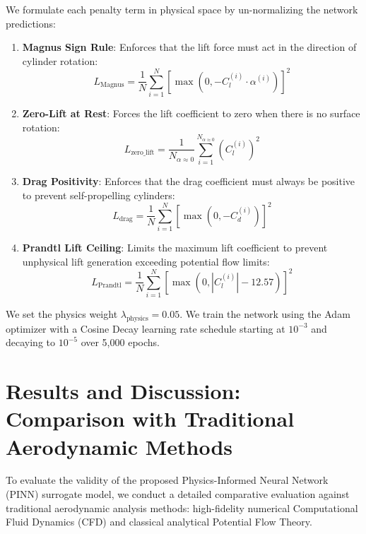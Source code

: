 \documentclass[aip,pof,reprint,onecolumn,amsmath,amssymb,graphicx,longbibliography]{revtex4-2}
\begin{document}
We formulate each penalty term in physical space by un-normalizing the network predictions:
\begin{enumerate}
    \item \textbf{Magnus Sign Rule}: Enforces that the lift force must act in the direction of cylinder rotation:
    \begin{equation}
    L_{\text{Magnus}} = \frac{1}{N} \sum_{i=1}^{N} \left[ \max(0, -C_l^{(i)} \cdot \alpha^{(i)}) \right]^2
    \end{equation}
    \item \textbf{Zero-Lift at Rest}: Forces the lift coefficient to zero when there is no surface rotation:
    \begin{equation}
    L_{\text{zero\_lift}} = \frac{1}{N_{\alpha \approx 0}} \sum_{i=1}^{N_{\alpha \approx 0}} \left( C_l^{(i)} \right)^2
    \end{equation}
    \item \textbf{Drag Positivity}: Enforces that the drag coefficient must always be positive to prevent self-propelling cylinders:
    \begin{equation}
    L_{\text{drag}} = \frac{1}{N} \sum_{i=1}^{N} \left[ \max(0, -C_d^{(i)}) \right]^2
    \end{equation}
    \item \textbf{Prandtl Lift Ceiling}: Limits the maximum lift coefficient to prevent unphysical lift generation exceeding potential flow limits:
    \begin{equation}
    L_{\text{Prandtl}} = \frac{1}{N} \sum_{i=1}^{N} \left[ \max(0, |C_l^{(i)}| - 12.57) \right]^2
    \end{equation}
\end{enumerate}
We set the physics weight $\lambda_{\text{physics}} = 0.05$. We train the network using the Adam optimizer with a Cosine Decay learning rate schedule starting at $10^{-3}$ and decaying to $10^{-5}$ over 5,000 epochs.

\section{\label{sec:discussion}Results and Discussion: Comparison with Traditional Aerodynamic Methods}
To evaluate the validity of the proposed Physics-Informed Neural Network (PINN) surrogate model, we conduct a detailed comparative evaluation against traditional aerodynamic analysis methods: high-fidelity numerical Computational Fluid Dynamics (CFD) and classical analytical Potential Flow Theory.
\end{document}
